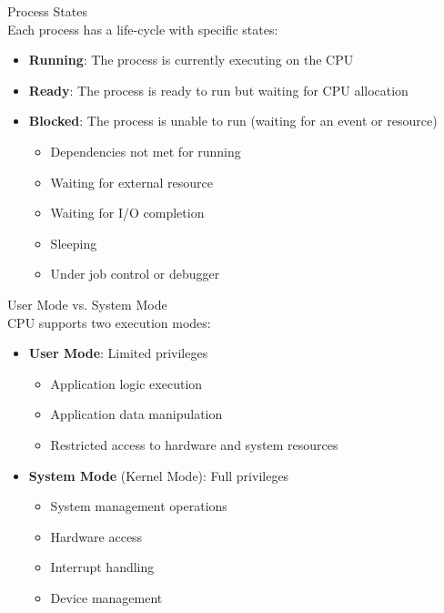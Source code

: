 
\begin{definition}{Process States}\\
    Each process has a life-cycle with specific states:
    \begin{itemize}
        \item \textbf{Running}: The process is currently executing on the CPU
        \item \textbf{Ready}: The process is ready to run but waiting for CPU allocation
        \item \textbf{Blocked}: The process is unable to run (waiting for an event or resource)
            \begin{itemize}
                \item Dependencies not met for running
                \item Waiting for external resource
                \item Waiting for I/O completion
                \item Sleeping
                \item Under job control or debugger
            \end{itemize}
    \end{itemize}
\end{definition}



\begin{concept}{User Mode vs. System Mode}\\
    CPU supports two execution modes:
    \begin{itemize}
        \item \textbf{User Mode}: Limited privileges
            \begin{itemize}
                \item Application logic execution
                \item Application data manipulation
                \item Restricted access to hardware and system resources
            \end{itemize}
        \item \textbf{System Mode} (Kernel Mode): Full privileges
            \begin{itemize}
                \item System management operations
                \item Hardware access
                \item Interrupt handling
                \item Device management
            \end{itemize}
    \end{itemize}
\end{concept}


